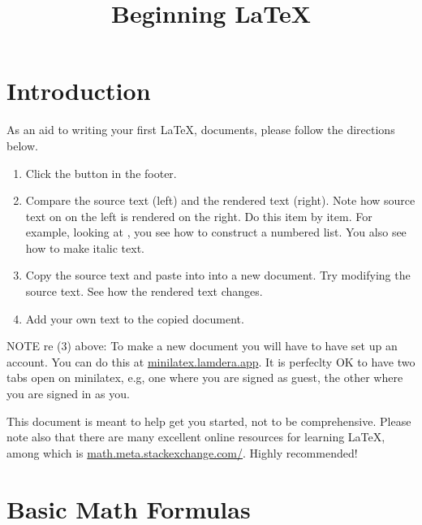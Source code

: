 \title{Beginning LaTeX}

\maketitle

\tableofcontents

\section{Introduction}


As an aid to writing your first LaTeX, documents, please follow the directions below.

\begin{enumerate}

\item Click the  button in the footer.

\item Compare the source text (left) and the rendered text (right).  Note how source text on on the left is rendered on the right.  Do this item by item.  For example, looking at , you see how to construct a numbered list.  You also see how to make italic text.

\item Copy the source text and paste into into a new document.  Try modifying the source text.  See how the rendered text changes.

\item Add  your own text to the copied document.

\end{enumerate}

NOTE re (3) above: To make a new document you will have to have set up an account.  You can do this at \href{https://minilatex.lamdera.app}{minilatex.lamdera.app}.  It is perfeclty OK to have two tabs open on minilatex, e.g, one where you are signed as guest, the other where you are signed in as you.

This document is meant to help get you started, not to be comprehensive.  Please note also that there are many excellent online resources for learning LaTeX, among which is \href{https://math.meta.stackexchange.com/questions/5020/mathjax-basic-tutorial-and-quick-reference}{math.meta.stackexchange.com/}. Highly recommended!

\section{Basic Math Formulas}

